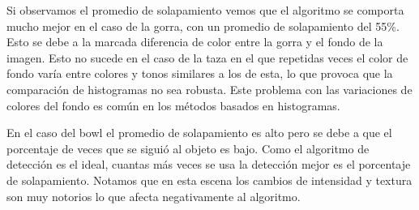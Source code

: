Si observamos el promedio de solapamiento vemos que el algoritmo se comporta mucho mejor en el caso de la gorra, con un promedio de solapamiento del 55\%. Esto se debe a la marcada diferencia de color entre la gorra y el fondo de la imagen. Esto no sucede en el caso de la taza en el que repetidas veces el color de fondo varía entre colores y tonos similares a los de esta, lo que provoca que la comparación de histogramas no sea robusta. Este problema con las variaciones de colores del fondo es común en los métodos basados en histogramas.

En el caso del bowl el promedio de solapamiento es alto pero se debe a que el porcentaje de veces que se siguió al objeto es bajo. Como el algoritmo de detección es el ideal, cuantas más veces se usa la detección mejor es el porcentaje de solapamiento. Notamos que en esta escena los cambios de intensidad y textura son muy notorios lo que afecta negativamente al algoritmo.


